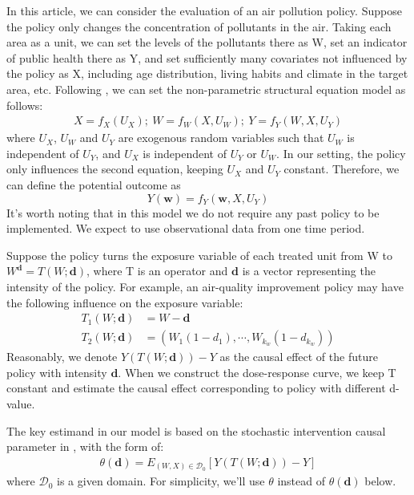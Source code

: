 \documentclass{article}
\theoremstyle{definition}
\newtheorem{proof of proposition}{Proof of Proposition}
\begin{document}
In this article, we can consider the evaluation of an air pollution policy. Suppose the policy only changes the concentration of pollutants in the air. Taking each area as a unit, we can set the levels of the pollutants there as W, set an indicator of public health there as Y, and set sufficiently many covariates not influenced by the policy as X, including age distribution, living habits and climate in the target area, etc. Following \cite{pearl2000models}, we can set the non-parametric structural equation model as follows: 
\begin{align}
    X = f_X(U_X);\ W = f_W(X, U_W );\ Y = f_Y (W, X, U_Y )
\end{align} 
where  $U_{X}$, $U_{W}$ and  $U_{Y}$  are exogenous random variables such that  $U_{W}$ is independent of $ U_{Y}$, and $U_{X}$ is independent of $ U_{Y}$ or $U_{W}$. In our setting, the policy only influences the second equation, keeping $U_{X}$ and $U_{Y}$ constant. Therefore, we can define the potential outcome as
\begin{equation}
    Y(\mathbf{w}) = f_Y (\mathbf{w}, X, U_Y)
\end{equation}
It's worth noting that in this model we do not require any past policy to be implemented. We expect to use observational data from one time period.

Suppose the policy turns the exposure variable of each treated unit from W to $W^{\mathbf{d}}=T(W;\mathbf{d})$, where T is an operator and $\mathbf{d}$ is a vector representing the intensity of the policy. For example, an air-quality improvement policy may have the following influence on the exposure variable:
\begin{align}
    T_1(W;\mathbf{d})&=W-\mathbf{d}\\
    T_2(W;\mathbf{d})&=(W_1(1-d_1),\cdots, W_{k_w}(1-d_{k_w}))
\end{align}
Reasonably, we denote $Y(T(W;\mathbf{d}))-Y$ as the causal effect of the future policy with intensity $\mathbf{d}$. When we construct the dose-response curve, we keep T constant and estimate the causal effect corresponding to policy with different d-value.

The key estimand in our model is based on the stochastic intervention causal parameter in \cite{munoz2012population}, with the form of:
\begin{align}
    \theta(\mathbf{d})=E_{(W,X)\in \mathcal{D}_0}[Y(T(W;\mathbf{d}))-Y] 
\end{align}
where $\mathcal{D}_0$ is a given domain. For simplicity, we'll use $\theta$ instead of $\theta(\mathbf{d})$ below. 
\end{document}
